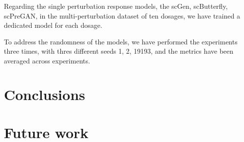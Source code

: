 \documentclass[12pt, a4paper]{article}
\begin{document}
Regarding the single perturbation response models, the scGen, scButterfly, scPreGAN, in the multi-perturbation dataset of ten dosages, we have trained a dedicated model for each dosage.

To address the randomness of the models, we have performed the experiments three times, with thres different seeds 1, 2, 19193, and the metrics have been averaged across experiments.


\section{Conclusions}

\section{Future work}




\appendix





\end{document}
